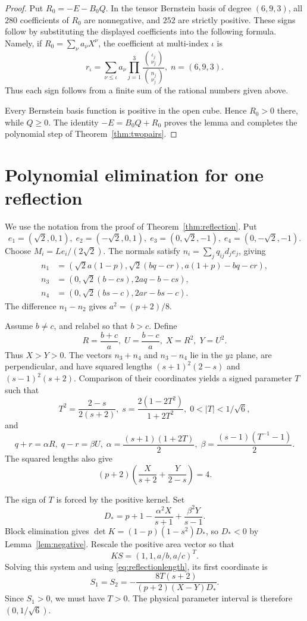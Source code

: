 \documentclass[11pt]{article}
\theoremstyle{definition}
\theoremstyle{remark}
\begin{document}
\begin{appendices}
\begin{proof}
Put $R_0=-E-B_0Q$. In the tensor Bernstein basis of degree $(6,9,3)$, all $280$ coefficients of $R_0$ are nonnegative, and $252$ are strictly positive. These signs follow by substituting the displayed coefficients into the following formula. Namely, if $R_0=\sum_\nu a_\nu X^\nu$, the coefficient at multi-index $\iota$ is
\[
r_\iota=\sum_{\nu\le\iota}a_\nu
\prod_{j=1}^3\frac{\binom{\iota_j}{\nu_j}}{\binom{n_j}{\nu_j}},
\; n=(6,9,3).
\]
Thus each sign follows from a finite sum of the rational numbers given above.

Every Bernstein basis function is positive in the open cube. Hence $R_0>0$ there, while $Q\ge0$. The identity $-E=B_0Q+R_0$ proves the lemma and completes the polynomial step of Theorem~\ref{thm:twopairs}.
\end{proof}

\section{Polynomial elimination for one reflection}
\label{app:reflection}

We use the notation from the proof of Theorem~\ref{thm:reflection}. Put
\[
e_1=(\sqrt2,0,1),\; e_2=(-\sqrt2,0,1),\;
e_3=(0,\sqrt2,-1),\; e_4=(0,-\sqrt2,-1).
\]
Choose $M_i=Le_i/(2\sqrt2)$. The normals satisfy $n_i=\sum_jq_{ij}d_je_j$, giving
\begin{align*}
n_1&=(\sqrt2a(1-p),\sqrt2(bq-cr),a(1+p)-bq-cr),\\
n_3&=(0,\sqrt2(b-cs),2aq-b-cs),\\
n_4&=(0,\sqrt2(bs-c),2ar-bs-c).
\end{align*}
The difference $n_1-n_2$ gives $a^2=(p+2)/8$.

Assume $b\ne c$, and relabel so that $b>c$. Define
\[
R=\frac{b+c}{a},\; U=\frac{b-c}{a},\; X=R^2,\; Y=U^2.
\]
Thus $X>Y>0$. The vectors $n_3+n_4$ and $n_3-n_4$ lie in the $yz$ plane, are perpendicular, and have squared lengths $(s+1)^2(2-s)$ and $(s-1)^2(s+2)$. Comparison of their coordinates yields a signed parameter $T$ such that
\[
T^2=\frac{2-s}{2(s+2)},\;
s=\frac{2(1-2T^2)}{1+2T^2},\; 0<|T|<1/\sqrt6,
\]
and
\[
q+r=\alpha R,\; q-r=\beta U,\;
\alpha=\frac{(s+1)(1+2T)}2,\;
\beta=\frac{(s-1)(T^{-1}-1)}2.
\]
The squared lengths also give
\begin{equation}
(p+2)\left(\frac{X}{s+2}+\frac{Y}{2-s}\right)=4.
\label{eq:reflectionlength}
\end{equation}

The sign of $T$ is forced by the positive kernel. Set
\[
D_* = p+1-\frac{\alpha^2X}{s+1}+\frac{\beta^2Y}{s-1}.
\]
Block elimination gives $\det K=(1-p)(1-s^2)D_*$, so $D_*<0$ by Lemma~\ref{lem:negative}. Rescale the positive area vector so that
\[
KS=(1,1,a/b,a/c)^T.
\]
Solving this system and using \eqref{eq:reflectionlength}, its first coordinate is
\[
S_1=S_2=-\frac{8T(s+2)}{(p+2)(X-Y)D_*}.
\]
Since $S_1>0$, we must have $T>0$. The physical parameter interval is therefore $(0,1/\sqrt6)$.


\end{appendices}
\end{document}
